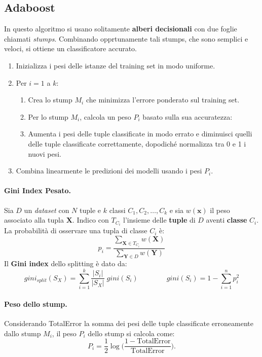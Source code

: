 \subsection{Adaboost} 
In questo algoritmo si usano solitamente \textbf{alberi decisionali} con due foglie chiamati \emph{stumps}. Combinando opprtunamente tali stumps, che sono semplici e veloci, si ottiene un classificatore accurato.

\begin{enumerate}
  \item Inizializza i pesi delle istanze del training set in modo uniforme.
  \item Per $i=1$ a $k$:
  \begin{enumerate}
    \item Crea lo stump $M_i$ che minimizza l'errore ponderato sul training set.
    \item Per lo stump $M_i$, calcola un peso $P_i$ basato sulla sua accuratezza:
    \item Aumenta i pesi delle tuple classificate in modo errato e diminuisci quelli delle tuple classificate correttamente, dopodiché normalizza tra 0 e 1 i nuovi pesi.
  \end{enumerate}
  \item Combina linearmente le predizioni dei modelli usando i pesi $P_i$.
\end{enumerate}

\paragraph{Gini Index Pesato.}
Sia $D$ un \emph{dataset} con $N$ tuple e $k$ classi $C_1, C_2, \dots, C_k$ e sia $w(\mathbf{x})$ il peso associato alla tupla $\mathbf{X}$. Indico con $T_{C_i}$ l'insieme delle \textbf{tuple} di $D$ aventi \textbf{classe} $C_i$. La probabilità di osservare una tupla di classe $C_i$ è:
\[
p_i = \frac{\sum_{\mathbf{X} \in T_{C_i}} w(\mathbf{X})}{\sum_{\mathbf{Y} \in D} w(\mathbf{Y})}
\]
Il \textbf{Gini index} dello splitting è dato da:
\[
gini_{split}(S_X) = \sum_{i=1}^k \frac{|S_i|}{|S_X|} \; gini(S_i)
\qquad\qquad
  gini(S_i) = 1 - \sum_{i=1}^n p_i^2
\]

\paragraph{Peso dello stump.} 
Considerando TotalError la somma dei pesi delle tuple classificate erroneamente dallo stump $M_i$, il peso $P_i$ dello stump si calcola come:
\[
P_i = \frac{1}{2} \log\biggl(\frac{1 - \text{TotalError}}{\text{TotalError}}\biggr).
\]

